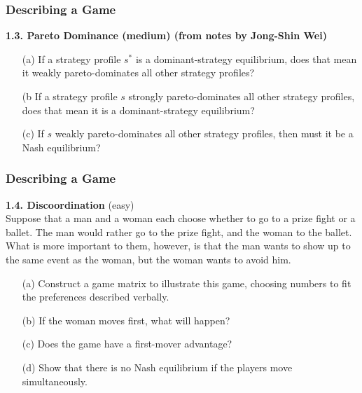  \begin{frame}[fragile]\frametitle{Describing a Game}

  {\bf 1.3. Pareto Dominance  (medium) (from  notes by Jong-Shin Wei)}
\begin{enumerate}

 \item[(a)] If a strategy profile $s^*$ is a dominant-strategy equilibrium, does
that mean it weakly pareto-dominates all other strategy profiles?

 \item[(b] If a strategy profile $s$ strongly pareto-dominates all other
strategy profiles, does that mean it is a dominant-strategy equilibrium?

 \item[(c)] If $s$ weakly pareto-dominates all other strategy profiles, then
must it be a Nash equilibrium?

  \end{enumerate}

\end{frame}
 \begin{frame}[fragile]\frametitle{Describing a Game}

  {\bf 1.4.   Discoordination } (easy)\\ Suppose that a man
and a woman each choose whether to go to a prize fight or a ballet. The man
would rather go to the prize fight, and the woman to the ballet. What is more
important to them, however, is that the man wants to show up to the same event
as the woman, but the woman wants to avoid him. \begin{enumerate}

 \item[(a)] Construct a game matrix to illustrate this game, choosing numbers to
fit the preferences described verbally.

 \item[(b)] If the woman moves first, what will happen?

 \item[(c)] Does the game have a first-mover advantage?

 \item[(d)] Show that there is no Nash equilibrium if the players move
simultaneously.

   \end{enumerate}
   
   \end{frame}
